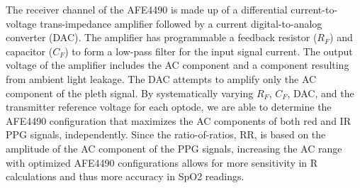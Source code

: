 The receiver channel of the AFE4490 is made up of a differential current-to-voltage trans-impedance amplifier followed by a current digital-to-analog converter (DAC). The amplifier has programmable a feedback resistor ($R_F$) and capacitor ($C_F$) to form a low-pass filter for the input signal current. The output voltage of the amplifier includes the AC component and a component resulting from ambient light leakage. The DAC attempts to amplify only the AC component of the pleth signal. By systematically varying $R_F$, $C_F$, DAC, and the transmitter reference voltage for each optode, we are able to determine the AFE4490 configuration that maximizes the AC components of both red and IR PPG signals, independently. Since the ratio-of-ratios, RR, is based on the amplitude of the AC component of the PPG signals, increasing the AC range with optimized AFE4490 configurations allows for more sensitivity in R calculations and thus more accuracy in SpO2 readings. 
        
